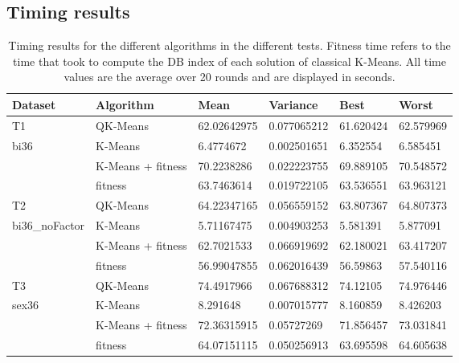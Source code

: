 \documentclass[12pt,a4paper,final]{article}
\begin{document}
\subsection{Timing results}

\begin{table}[h]
\caption{Timing results for the different algorithms in the different tests. Fitness time refers to the time that took to compute the DB index of each solution of classical K-Means. All time values are the average over 20 rounds and are displayed in seconds.}
\label{my-label}
\begin{tabular}{l|l|l|l|l|l|}
\hline
\multicolumn{1}{|l|}{Dataset}        & Algorithm         & Mean        & Variance    & Best      & Worst     \\ \hline
\multicolumn{1}{|l|}{T1}             & QK-Means          & 62.02642975 & 0.077065212 & 61.620424 & 62.579969 \\ \hline
\multicolumn{1}{|l|}{bi36}           & K-Means           & 6.4774672   & 0.002501651 & 6.352554  & 6.585451  \\ \hline
                                     & K-Means + fitness & 70.2238286  & 0.022223755 & 69.889105 & 70.548572 \\ \cline{2-6} 
                                     & fitness           & 63.7463614  & 0.019722105 & 63.536551 & 63.963121 \\ \hline
\multicolumn{1}{|l|}{T2}             & QK-Means          & 64.22347165 & 0.056559152 & 63.807367 & 64.807373 \\ \hline
\multicolumn{1}{|l|}{bi36\_noFactor} & K-Means           & 5.71167475  & 0.004903253 & 5.581391  & 5.877091  \\ \hline
                                     & K-Means + fitness & 62.7021533  & 0.066919692 & 62.180021 & 63.417207 \\ \cline{2-6} 
                                     & fitness           & 56.99047855 & 0.062016439 & 56.59863  & 57.540116 \\ \hline
\multicolumn{1}{|l|}{T3}             & QK-Means          & 74.4917966  & 0.067688312 & 74.12105  & 74.976446 \\ \hline
\multicolumn{1}{|l|}{sex36}          & K-Means           & 8.291648    & 0.007015777 & 8.160859  & 8.426203  \\ \hline
                                     & K-Means + fitness & 72.36315915 & 0.05727269  & 71.856457 & 73.031841 \\ \cline{2-6} 
                                     & fitness           & 64.07151115 & 0.050256913 & 63.695598 & 64.605638 \\ \cline{2-6} 
\end{tabular}
\end{table}
\end{document}
